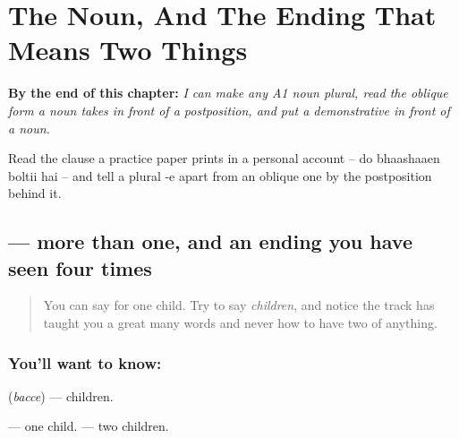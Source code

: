 
\chapter{The Noun, And The Ending That Means Two Things}
\label{ch:hi-sangya}

\begin{chapteropening}
\textbf{By the end of this chapter:} \emph{I can make any A1 noun plural, read the oblique form a noun takes in front of a postposition, and put a demonstrative in front of a noun.}

Read the clause a practice paper prints in a personal account -- do bhaashaaen boltii hai -- and tell a plural -e apart from an oblique one by the postposition behind it.
\end{chapteropening}

\section[\texorpdfstring{\hi{बच्चे} (bacce)}{बच्चे (bacce)}]{ — more than one, and an ending you have seen four times}

\label{lesson:HI-C91-bacche-plural}



\begin{quote}
You can say \textbf{} for one child. Try to say \emph{children}, and notice the track has taught you a great many words and never how to have two of anything.
\end{quote}

\subsection*{You'll want to know: }
\textbf{} (\emph{bacce}) — children.

\textbf{ } — one child. \textbf{ } — two children.

